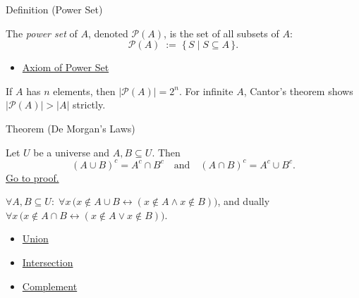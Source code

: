 \begin{definitionbox}{Definition (Power Set)}
\begin{definition}\label{def:power-set}
The \emph{power set} of $A$, denoted $\mathcal{P}(A)$, is the set of all
subsets of $A$:
\[
\mathcal{P}(A) \;:=\; \{\, S \mid S \subseteq A \,\}.
\]
\end{definition}
\end{definitionbox}


\begin{dependencies}
\begin{itemize}
  \item \hyperref[ax:power-set]{Axiom of Power Set}
\end{itemize}
\end{dependencies}

\begin{remark*}[Size]
If $A$ has $n$ elements, then $|\mathcal{P}(A)| = 2^n$. For infinite $A$,
Cantor's theorem shows $|\mathcal{P}(A)| > |A|$ strictly.
\end{remark*}

\begin{theorembox}{Theorem (De Morgan's Laws)}
\begin{theorem}\label{thm:de-morgan}
Let $U$ be a universe and $A,B \subseteq U$. Then
\[
(A \cup B)^c = A^c \cap B^c
\quad\text{and}\quad
(A \cap B)^c = A^c \cup B^c.
\]
\hyperref[prf:de-morgan]{Go to proof.}
\end{theorem}
\end{theorembox}

\begin{remark*}
$\forall A, B \subseteq U:\; \forall x\,\bigl(x \notin A \cup B \leftrightarrow (x \notin A \wedge x \notin B)\bigr)$, and dually $\forall x\,\bigl(x \notin A \cap B \leftrightarrow (x \notin A \vee x \notin B)\bigr)$.
\end{remark*}

\begin{dependencies}
\begin{itemize}
  \item \hyperref[def:union]{Union}
  \item \hyperref[def:intersection]{Intersection}
  \item \hyperref[def:complement]{Complement}
\end{itemize}
\end{dependencies}


